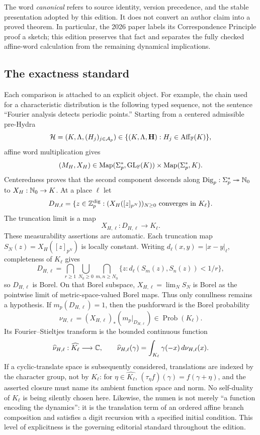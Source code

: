 \begin{sourceissue}
The word \emph{canonical} refers to source identity, version precedence, and
the stable presentation adopted by this edition.  It does not convert an
author claim into a proved theorem.  In particular, the 2026 paper labels its
Correspondence Principle proof a sketch; this edition preserves that fact and
separates the fully checked affine-word calculation from the remaining
dynamical implications.
\end{sourceissue}

\subsection{The exactness standard}

Each comparison is attached to an explicit object.  For example, the chain
used for a characteristic distribution is the following typed sequence, not
the sentence ``Fourier analysis detects periodic points.''  Starting from a
centered admissible pre-Hydra
\[
 \mathcal H=(K,\Lambda,(H_j)_{j\in\mathcal A_p})
 \in\{(K,\Lambda,\mathbf H):H_j\in\operatorname{Aff}_{\mathbb F}(K)\},
\]
affine word multiplication gives
\[
 (M_H,X_H)\in
 \operatorname{Map}(\Sigma_p^*,\operatorname{GL}_{\mathbb F}(K))
 \times\operatorname{Map}(\Sigma_p^*,K).
\]
Centeredness proves that the second component descends along
$\operatorname{Dig}_p:\Sigma_p^*\twoheadrightarrow\mathbb N_0$ to
$X_H:\mathbb N_0\to K$.  At a place $\ell$ let
\[
 D_{H,\ell}=\{z\in\mathbb Z_p^{\mathrm{dig}}:
             (X_H([z]_{p^N}))_{N\geq0}\text{ converges in }K_\ell\}.
\]
The truncation limit is a map
\[
 X_{H,\ell}:D_{H,\ell}\longrightarrow K_\ell.
\]
These measurability assertions are automatic.  Each truncation map
$S_N(z)=X_H([z]_{p^N})$ is locally constant.  Writing
$d_\ell(x,y)=|x-y|_\ell$, completeness of $K_\ell$ gives
\[
 D_{H,\ell}
 =\bigcap_{r\geq1}\bigcup_{N_0\geq0}
   \bigcap_{m,n\geq N_0}
   \{z:d_\ell(S_m(z),S_n(z))<1/r\},
\]
so $D_{H,\ell}$ is Borel.  On that Borel subspace,
$X_{H,\ell}=\lim_NS_N$ is Borel as the pointwise limit of metric-space-valued
Borel maps.  Thus only conullness remains a hypothesis.  If
$m_p(D_{H,\ell})=1$, then the pushforward is the Borel probability
\[
 \nu_{H,\ell}=(X_{H,\ell})_*
   (m_p|_{D_{H,\ell}})\in\operatorname{Prob}(K_\ell).
\]
Its Fourier--Stieltjes transform is the bounded continuous function
\[
 \widehat\nu_{H,\ell}:\widehat{K_\ell}\longrightarrow\mathbb C,
 \qquad
 \widehat\nu_{H,\ell}(\gamma)
 =\int_{K_\ell}\gamma(-x)\,d\nu_{H,\ell}(x).
\]
If a cyclic-translate space is subsequently considered, translations are
indexed by the character group, not by $K_\ell$: for
$\eta\in\widehat{K_\ell}$,
$(\tau_\eta f)(\gamma)=f(\gamma+\eta)$, and the asserted closure must name
its ambient function space and norm.  No self-duality of $K_\ell$ is being
silently chosen here.  Likewise, the numen is not merely ``a function
encoding the dynamics'': it is the translation term of an ordered affine
branch composition and satisfies a digit recursion with a specified initial
condition.  This level of explicitness is the governing editorial standard
throughout the edition.
